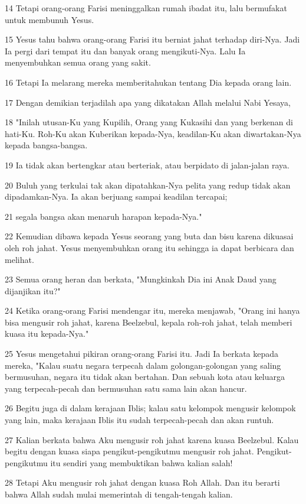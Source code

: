 \par 14 Tetapi orang-orang Farisi meninggalkan rumah ibadat itu, lalu bermufakat untuk membunuh Yesus.
\par 15 Yesus tahu bahwa orang-orang Farisi itu berniat jahat terhadap diri-Nya. Jadi Ia pergi dari tempat itu dan banyak orang mengikuti-Nya. Lalu Ia menyembuhkan semua orang yang sakit.
\par 16 Tetapi Ia melarang mereka memberitahukan tentang Dia kepada orang lain.
\par 17 Dengan demikian terjadilah apa yang dikatakan Allah melalui Nabi Yesaya,
\par 18 "Inilah utusan-Ku yang Kupilih, Orang yang Kukasihi dan yang berkenan di hati-Ku. Roh-Ku akan Kuberikan kepada-Nya, keadilan-Ku akan diwartakan-Nya kepada bangsa-bangsa.
\par 19 Ia tidak akan bertengkar atau berteriak, atau berpidato di jalan-jalan raya.
\par 20 Buluh yang terkulai tak akan dipatahkan-Nya pelita yang redup tidak akan dipadamkan-Nya. Ia akan berjuang sampai keadilan tercapai;
\par 21 segala bangsa akan menaruh harapan kepada-Nya."
\par 22 Kemudian dibawa kepada Yesus seorang yang buta dan bisu karena dikuasai oleh roh jahat. Yesus menyembuhkan orang itu sehingga ia dapat berbicara dan melihat.
\par 23 Semua orang heran dan berkata, "Mungkinkah Dia ini Anak Daud yang dijanjikan itu?"
\par 24 Ketika orang-orang Farisi mendengar itu, mereka menjawab, "Orang ini hanya bisa mengusir roh jahat, karena Beelzebul, kepala roh-roh jahat, telah memberi kuasa itu kepada-Nya."
\par 25 Yesus mengetahui pikiran orang-orang Farisi itu. Jadi Ia berkata kepada mereka, "Kalau suatu negara terpecah dalam golongan-golongan yang saling bermusuhan, negara itu tidak akan bertahan. Dan sebuah kota atau keluarga yang terpecah-pecah dan bermusuhan satu sama lain akan hancur.
\par 26 Begitu juga di dalam kerajaan Iblis; kalau satu kelompok mengusir kelompok yang lain, maka kerajaan Iblis itu sudah terpecah-pecah dan akan runtuh.
\par 27 Kalian berkata bahwa Aku mengusir roh jahat karena kuasa Beelzebul. Kalau begitu dengan kuasa siapa pengikut-pengikutmu mengusir roh jahat. Pengikut-pengikutmu itu sendiri yang membuktikan bahwa kalian salah!
\par 28 Tetapi Aku mengusir roh jahat dengan kuasa Roh Allah. Dan itu berarti bahwa Allah sudah mulai memerintah di tengah-tengah kalian.
